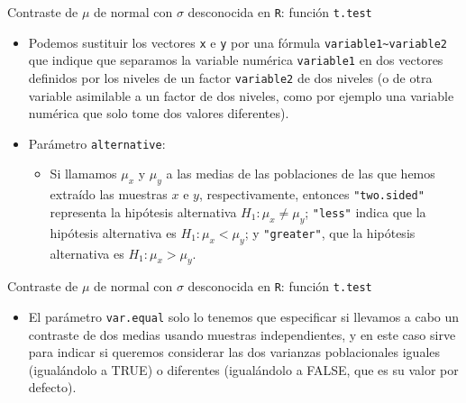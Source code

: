\documentclass[
  ignorenonframetext,
]{beamer}
\providecommand{\tightlist}{%
  \setlength{\itemsep}{0pt}\setlength{\parskip}{0pt}}
\begin{document}
\begin{frame}[fragile]{Contraste de \(\mu\) de normal con \(\sigma\)
desconocida en \texttt{R}: función \texttt{t.test}}
\protect\hypertarget{contraste-de-mu-de-normal-con-sigma-desconocida-en-r-funciuxf3n-t.test-8}{}
\begin{itemize}[<+->]
\item
  Podemos sustituir los vectores \texttt{x} e \texttt{y} por una fórmula
  \texttt{variable1\textasciitilde{}variable2} que indique que separamos
  la variable numérica \texttt{variable1} en dos vectores definidos por
  los niveles de un factor \texttt{variable2} de dos niveles (o de otra
  variable asimilable a un factor de dos niveles, como por ejemplo una
  variable numérica que solo tome dos valores diferentes).
\item
  Parámetro \texttt{alternative}:

  \begin{itemize}[<+->]
  \tightlist
  \item
    Si llamamos \(\mu_x\) y \(\mu_y\) a las medias de las poblaciones de
    las que hemos extraído las muestras \(x\) e \(y\), respectivamente,
    entonces \texttt{"two.sided"} representa la hipótesis alternativa
    \(H_1: \mu_x \neq \mu_y\); \texttt{"less"} indica que la hipótesis
    alternativa es \(H_1: \mu_x< \mu_y\); y \texttt{"greater"}, que la
    hipótesis alternativa es \(H_1: \mu_x> \mu_y\).
  \end{itemize}
\end{itemize}
\end{frame}

\begin{frame}[fragile]{Contraste de \(\mu\) de normal con \(\sigma\)
desconocida en \texttt{R}: función \texttt{t.test}}
\protect\hypertarget{contraste-de-mu-de-normal-con-sigma-desconocida-en-r-funciuxf3n-t.test-9}{}
\begin{itemize}[<+->]
\tightlist
\item
  El parámetro \texttt{var.equal} solo lo tenemos que especificar si
  llevamos a cabo un contraste de dos medias usando muestras
  independientes, y en este caso sirve para indicar si queremos
  considerar las dos varianzas poblacionales iguales (igualándolo a
  TRUE) o diferentes (igualándolo a FALSE, que es su valor por defecto).
\end{itemize}
\end{frame}
\end{document}
